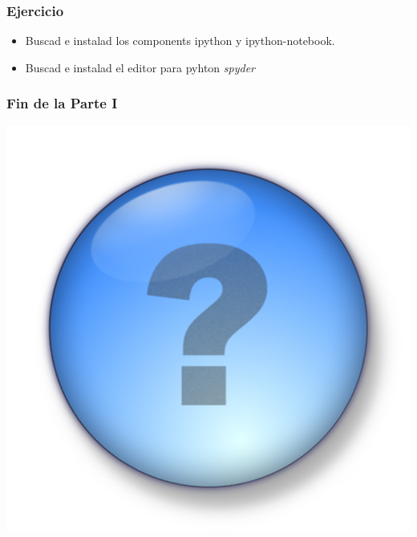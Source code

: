 \documentclass[colorlinks,10pt]{beamer}
\begin{document}
\begin{frame}
  \frametitle{Ejercicio}
  \begin{block}{}
    \begin{itemize}
    \item<+-> Buscad e instalad los components ipython y ipython-notebook.
    \item<+-> Buscad e instalad el editor para pyhton \emph{spyder}
    \end{itemize}
  \end{block}
\end{frame}





\begin{frame}
  \frametitle{Fin de la Parte I }
  \begin{center}
    \centering \includegraphics[width=0.5\linewidth]{figs/question_mark}
  \end{center}
\end{frame}
\end{document}
